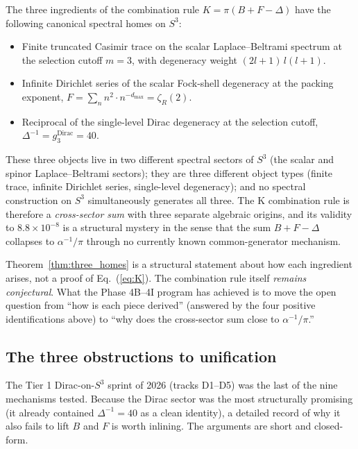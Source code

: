 \begin{theorem}\label{thm:three_homes}
The three ingredients of the combination rule $K = \pi(B + F - \Delta)$
have the following canonical spectral homes on $S^3$:
\begin{itemize}
  \item[$(B)$] Finite truncated Casimir trace on the scalar
    Laplace--Beltrami spectrum at the selection cutoff $m = 3$, with
    degeneracy weight $(2l+1)\,l(l+1)$.
  \item[$(F)$] Infinite Dirichlet series of the scalar Fock-shell
    degeneracy at the packing exponent,
    $F = \sum_{n} n^2 \cdot n^{-d_{\max}} = \zeta_R(2)$.
  \item[$(\Delta)$] Reciprocal of the single-level Dirac degeneracy at
    the selection cutoff, $\Delta^{-1} = g_3^{\text{Dirac}} = 40$.
\end{itemize}
These three objects live in two different spectral sectors of $S^3$ (the
scalar and spinor Laplace--Beltrami sectors); they are three different
object types (finite trace, infinite Dirichlet series, single-level
degeneracy); and no spectral construction on $S^3$ simultaneously
generates all three. The K combination rule is therefore a
\emph{cross-sector sum} with three separate algebraic origins, and its
validity to $8.8 \times 10^{-8}$ is a structural mystery in the sense
that the sum $B + F - \Delta$ collapses to $\alpha^{-1}/\pi$ through no
currently known common-generator mechanism.
\end{theorem}

Theorem~\ref{thm:three_homes} is a structural statement about how each
ingredient arises, not a proof of Eq.~(\ref{eq:K}). The combination
rule itself \emph{remains conjectural}. What the Phase 4B--4I program
has achieved is to move the open question from ``how is each piece
derived'' (answered by the four positive identifications above) to
``why does the cross-sector sum close to $\alpha^{-1}/\pi$.''

\subsection{The three obstructions to unification}\label{sec:obstructions}

The Tier 1 Dirac-on-$S^3$ sprint of 2026 (tracks D1--D5) was the last of
the nine mechanisms tested. Because the Dirac sector was the most
structurally promising (it already contained $\Delta^{-1} = 40$ as a
clean identity), a detailed record of why it also fails to lift $B$ and
$F$ is worth inlining. The arguments are short and closed-form.

